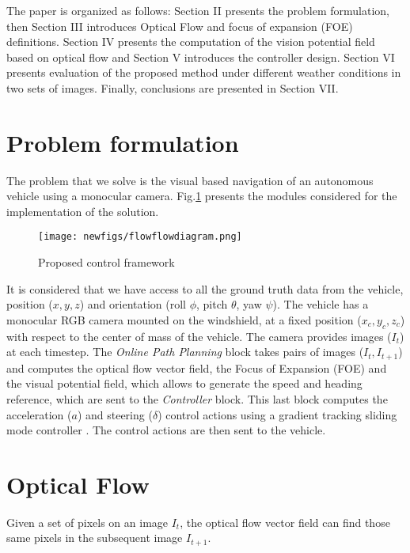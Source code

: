\documentclass[letterpaper, 10 pt, conference]{ieeeconf}  %
\begin{document}
The paper is organized as follows: Section II presents the problem formulation, then Section III introduces Optical Flow and focus of expansion (FOE) definitions. Section IV presents the computation of the vision potential field based on optical flow and Section V introduces the controller design. Section VI presents evaluation of the proposed method under different weather conditions in two sets of images. Finally, conclusions are presented in Section VII.

\section{Problem formulation}

The problem that we solve is the visual based navigation of an autonomous vehicle using a monocular camera. Fig.\ref{fig:basicdiagram} presents the modules considered for the implementation of the solution. 

    \begin{figure}[h!]
    \centering
    \texttt{[image: newfigs/flowflowdiagram.png]}
    \caption{Proposed control framework}
    \label{fig:basicdiagram}
    \end{figure}

It is considered that we have access to all the ground truth data from the vehicle, position ($x,y,z$) and orientation (roll $\phi$, pitch $\theta$, yaw $\psi$). The vehicle has a monocular RGB camera mounted on the windshield, at a fixed position ($x_c,y_c,z_c$) with respect to the center of mass of the vehicle. The camera provides images ($I_t$) at each timestep. The \textit{Online Path Planning} block takes pairs of images ($I_t, I_{t+1}$) and computes the optical flow vector field, the Focus of Expansion (FOE) and the visual potential field, which allows to generate the speed and heading reference, which are sent to the \textit{Controller} block. This last block computes the acceleration ($a$) and steering ($\delta$) control actions using a gradient tracking sliding mode controller \cite{guldner1995tracking}. The control actions are then sent to the vehicle. 

\section{Optical Flow}

Given a set of pixels on an image $I_t$, the optical flow vector field can find those same pixels in the subsequent image $I_{t+1}$. 
\end{document}
